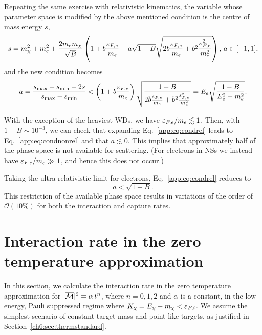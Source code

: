 Repeating the same exercise with relativistic kinematics, 
the variable whose parameter space is modified by the above mentioned condition is the centre of mass energy $s$,
\begin{equation}
s = m_\chi^2+m_e^2+\frac{2m_em_\chi}{\sqrt{B}}\left(1+b\frac{\varepsilon_{F,e}}{m_e}-a\sqrt{1-B}\sqrt{2b\frac{\varepsilon_{F,e}}{m_e}+b^2\frac{\varepsilon_{F,e}^2}{m_e^2}}\right), \,  a\in[-1,1], 
\end{equation}
and the new condition becomes
\begin{equation}
a= \frac{s_\mathrm{max}+s_\mathrm{min}-2s}{s_\mathrm{max}-s_\mathrm{min}} <\left(1+b\frac{\varepsilon_{F,e}}{m_e}\right)\sqrt{\frac{1-B}{2b\frac{\varepsilon_{F,e}}{m_e}+b^2\frac{\varepsilon_{F,e}^2}{m_e^2}}}
= E_e\sqrt{\frac{1-B}{E_e^2-m_e^2}}.\label{app:eq:condrel}
\end{equation}


With the exception of the heaviest WDs, we have $\varepsilon_{F,e}/m_e\lesssim 1$. Then, with $1-B\sim10^{-3}$, we can check that expanding Eq.~\ref{app:eq:condrel} leads to Eq.~\ref{app:eq:condnonrel} and that $a\lesssim 0$.
This implies that approximately half of the phase space is not available for scattering. (For electrons in NSs we instead have $\varepsilon_{F,e}/m_e\gg1$, and hence this does not occur.) 

Taking the ultra-relativistic limit for electrons, Eq.~\ref{app:eq:condrel} reduces to
\begin{equation}
a <\sqrt{1-B}\label{app:eq:condurel}.
\end{equation}
This restriction of the available phase space results in variations of the order of $\mathcal{O}(10\%)$ for both the interaction and capture rates.

\section{Interaction rate in the zero temperature approximation}
\label{app:sec:int_low_temp}

In this section,  we calculate the interaction rate in the zero temperature approximation for $|\overline{\mathcal M}|^2 = \alpha \, t^n$, where $n=0,1,2$ and $\alpha$ is a constant, in the low energy, Pauli suppressed regime where $K_\chi=E_\chi-m_\chi<\varepsilon_{F,i}$. 
We assume the simplest scenario of constant target mass and point-like targets, as justified in Section~\ref{ch6:sec:thermstandard}.



